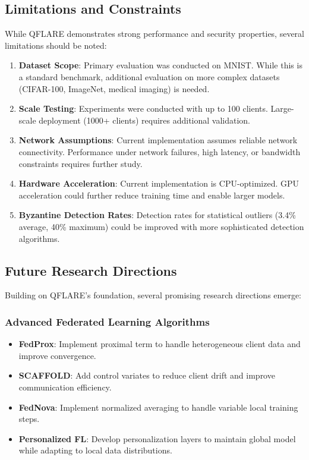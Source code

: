\documentclass[12pt,a4paper]{article}
\begin{document}
\subsection{Limitations and Constraints}

While QFLARE demonstrates strong performance and security properties, several limitations should be noted:

\begin{enumerate}
    \item \textbf{Dataset Scope}: Primary evaluation was conducted on MNIST. While this is a standard benchmark, additional evaluation on more complex datasets (CIFAR-100, ImageNet, medical imaging) is needed.
    
    \item \textbf{Scale Testing}: Experiments were conducted with up to 100 clients. Large-scale deployment (1000+ clients) requires additional validation.
    
    \item \textbf{Network Assumptions}: Current implementation assumes reliable network connectivity. Performance under network failures, high latency, or bandwidth constraints requires further study.
    
    \item \textbf{Hardware Acceleration}: Current implementation is CPU-optimized. GPU acceleration could further reduce training time and enable larger models.
    
    \item \textbf{Byzantine Detection Rates}: Detection rates for statistical outliers (3.4\% average, 40\% maximum) could be improved with more sophisticated detection algorithms.
\end{enumerate}

\subsection{Future Research Directions}

Building on QFLARE's foundation, several promising research directions emerge:

\subsubsection{Advanced Federated Learning Algorithms}

\begin{itemize}
    \item \textbf{FedProx}: Implement proximal term to handle heterogeneous client data and improve convergence.
    \item \textbf{SCAFFOLD}: Add control variates to reduce client drift and improve communication efficiency.
    \item \textbf{FedNova}: Implement normalized averaging to handle variable local training steps.
    \item \textbf{Personalized FL}: Develop personalization layers to maintain global model while adapting to local data distributions.
\end{itemize}
\end{document}
